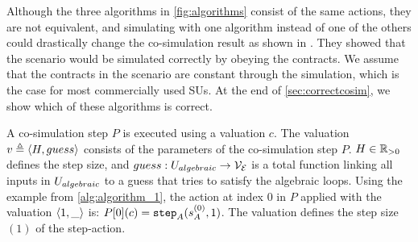 Although the three algorithms in \cref{fig:algorithms} consist of the same actions, they are not equivalent, and simulating with one algorithm instead of one of the others could drastically change the co-simulation result as shown in \cite{Gomes2019c}. 
They showed that the scenario would be simulated correctly by obeying the contracts. 
We assume that the contracts in the scenario are constant through the simulation, which is the case for most commercially used SUs.
At the end of \cref{sec:correctcosim}, we show which of these algorithms is correct.

A co-simulation step $P$ is executed using a valuation $c$. The valuation $v \triangleq  \left\langle H, guess \right\rangle $ consists of the parameters of the co-simulation step $P$.  $H \in \mathbb{R}_{> 0}$ defines the step size, and $guess : U_{algebraic} \to \mathcal{V_{E}}$ is a total function linking all inputs in $U_{algebraic}$ to a guess that tries to satisfy the algebraic loops. Using the example from \cref{alg:algorithm_1}, the action at index 0 in $P$ applied with the valuation $ \left\langle 1,\_ \right\rangle $ is: $P[0](c) = \mathtt{step}_{A}(s_{A}^{(0)}, 1)$. The valuation defines the step size $(1)$ of the step-action. 

